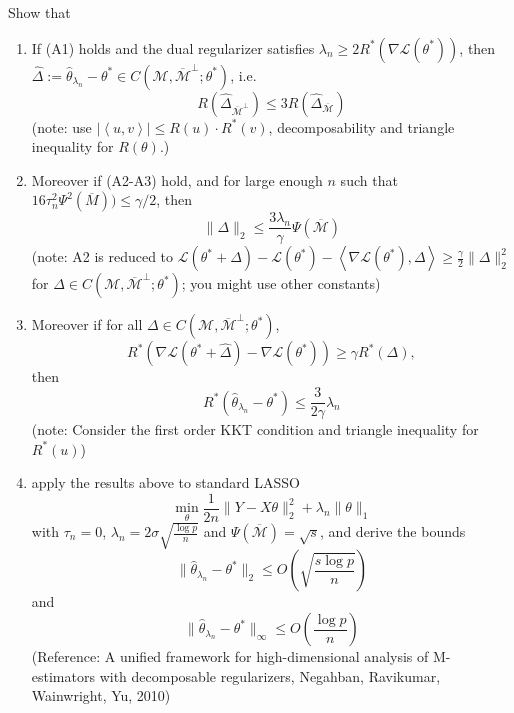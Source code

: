 \documentclass[11pt]{article}
\def\L{{\mathcal L}}
\def\M{{\mathcal M}}
\def\R{{\mathbb R}}
\begin{document}
\begin{enumerate}
Show that
\begin{enumerate}
\item If (A1) holds and the dual regularizer satisfies $\lambda_n \geq 2 R^\ast(\nabla \L(\theta^\ast))$, then $\hat{\Delta} := \hat{\theta}_{\lambda_n} - \theta^\ast \in C(\M,\overline{\M}^\perp;\theta^\ast)$, i.e.
\[  R(\hat{\Delta}_{\overline{\M}^\perp}) \leq 3 R(\hat{\Delta}_{\overline{\M}}) \]
(note: use $|\left< u, v\right>| \leq R(u) \cdot R^\ast(v)$, decomposability and triangle inequality for $R(\theta)$.)
\item Moreover if (A2-A3) hold, and for large enough $n$ such that $16 \tau_n^2 \Psi^2(\overline{M})) \leq \gamma /2$, then
\[ \|\Delta \|_2 \leq \frac{3\lambda_n}{\gamma} \Psi(\overline{\M}) \]
(note: A2 is reduced to $ \L(\theta^\ast + \Delta) - \L(\theta^\ast) - \left< \nabla \L(\theta^\ast), \Delta \right> \geq \frac{\gamma}{2}\|\Delta\|_2^2$ for $\Delta\in  C(\M,\overline{\M}^\perp;\theta^\ast)$; you might use other constants)
\item Moreover if for all $\Delta\in  C(\M,\overline{\M}^\perp;\theta^\ast)$, %
\[ R^\ast (\nabla \L(\theta^\ast + \hat{\Delta}) - \nabla \L(\theta^\ast)) \geq \gamma R^\ast(\Delta), \]
then
\[ R^\ast(\hat{\theta}_{\lambda_n} - \theta^\ast) \leq \frac{3}{2\gamma} \lambda_n \]
(note: Consider the first order KKT condition and triangle inequality for $R^\ast(u)$)
\item apply the results above to standard LASSO
\[ \min_\theta \frac{1}{2 n} \| Y - X\theta\|_2^2 + \lambda_n \|\theta\|_1 \]
with $\tau_n = 0$, $\lambda_n = 2\sigma \sqrt{\frac{\log p}{n}}$ and $\Psi(\overline{\M}) = \sqrt{s}$, and derive the bounds
\[ \|\hat{\theta}_{\lambda_n} - \theta^\ast\|_2 \leq O( \sqrt{\frac{s\log p}{n}} ) \]
and
\[ \|\hat{\theta}_{\lambda_n} - \theta^\ast\|_\infty \leq O ( \frac{\log p}{n}) \]
(Reference: A unified framework for high-dimensional analysis of M-estimators with decomposable regularizers, Negahban, Ravikumar, Wainwright, Yu, 2010)
\end{enumerate}



\end{enumerate}
\end{document}
